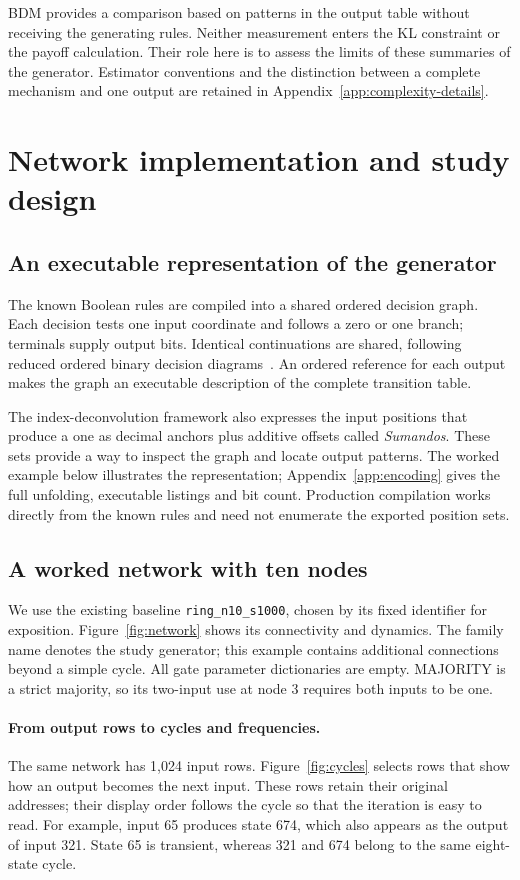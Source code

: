 \documentclass[11pt,a4paper]{article}
\begin{document}
BDM provides a comparison based on patterns in the output table without
receiving the generating rules. Neither measurement enters the KL
constraint or the payoff calculation. Their role here is to assess the
limits of these summaries of the generator. Estimator conventions and
the distinction between a complete mechanism and one output are retained
in Appendix~\ref{app:complexity-details}.

\section{Network implementation and study design}\label{app:study}
\subsection{An executable representation of the generator}
The known Boolean rules are compiled into a shared ordered decision graph.
Each decision tests one input coordinate and follows a zero or one branch;
terminals supply output bits. Identical continuations are shared, following
reduced ordered binary decision diagrams~\cite{bryant}. An ordered reference
for each output makes the graph an executable description of the complete
transition table.

The index-deconvolution framework also expresses the input positions that
produce a one as decimal anchors plus additive offsets called
\emph{Sumandos}. These sets provide a way to inspect the graph and locate
output patterns. The worked example below illustrates the representation;
Appendix~\ref{app:encoding} gives the full unfolding, executable listings
and bit count. Production compilation works directly from the known
rules and need not enumerate the exported position sets.

\subsection{A worked network with ten nodes}
We use the existing baseline \texttt{ring\_n10\_s1000}, chosen by its fixed
identifier for exposition. Figure~\ref{fig:network} shows its connectivity
and dynamics. The family name denotes the study generator; this example
contains additional connections beyond a simple cycle. All gate parameter
dictionaries are empty. MAJORITY is a strict majority, so its two-input use
at node 3 requires both inputs to be one.

\paragraph{From output rows to cycles and frequencies.}
The same network has 1,024 input rows. Figure~\ref{fig:cycles} selects
rows that show how an output becomes the next input. These rows retain
their original addresses; their display order follows the cycle so that
the iteration is easy to read. For example, input 65 produces state 674,
which also appears as the output of input 321. State 65 is transient,
whereas 321 and 674 belong to the same eight-state cycle.
\end{document}

